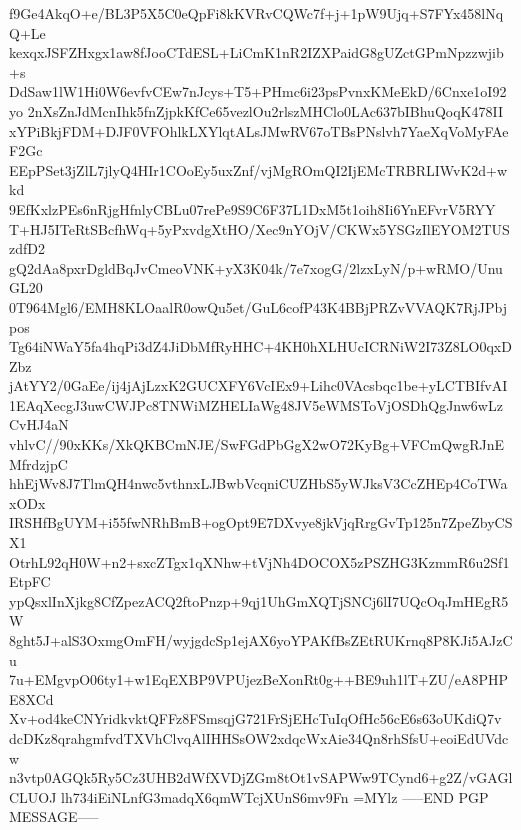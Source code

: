 f9Ge4AkqO+e/BL3P5X5C0eQpFi8kKVRvCQWc7f+j+1pW9Ujq+S7FYx458lNqQ+Le
kexqxJSFZHxgx1aw8fJooCTdESL+LiCmK1nR2IZXPaidG8gUZctGPmNpzzwjib+s
DdSaw1lW1Hi0W6evfvCEw7nJcys+T5+PHmc6i23psPvnxKMeEkD/6Cnxe1oI92yo
2nXsZnJdMcnIhk5fnZjpkKfCe65vezlOu2rlszMHClo0LAc637bIBhuQoqK478II
xYPiBkjFDM+DJF0VFOhlkLXYlqtALsJMwRV67oTBsPNslvh7YaeXqVoMyFAeF2Gc
EEpPSet3jZlL7jlyQ4HIr1COoEy5uxZnf/vjMgROmQI2IjEMcTRBRLIWvK2d+wkd
9EfKxlzPEs6nRjgHfnlyCBLu07rePe9S9C6F37L1DxM5t1oih8Ii6YnEFvrV5RYY
T+HJ5ITeRtSBcfhWq+5yPxvdgXtHO/Xec9nYOjV/CKWx5YSGzIlEYOM2TUSzdfD2
gQ2dAa8pxrDgldBqJvCmeoVNK+yX3K04k/7e7xogG/2lzxLyN/p+wRMO/UnuGL20
0T964Mgl6/EMH8KLOaalR0owQu5et/GuL6cofP43K4BBjPRZvVVAQK7RjJPbjpos
Tg64iNWaY5fa4hqPi3dZ4JiDbMfRyHHC+4KH0hXLHUcICRNiW2I73Z8LO0qxDZbz
jAtYY2/0GaEe/ij4jAjLzxK2GUCXFY6VcIEx9+Lihc0VAcsbqc1be+yLCTBIfvAI
1EAqXecgJ3uwCWJPc8TNWiMZHELIaWg48JV5eWMSToVjOSDhQgJnw6wLzCvHJ4aN
vhlvC//90xKKs/XkQKBCmNJE/SwFGdPbGgX2wO72KyBg+VFCmQwgRJnEMfrdzjpC
hhEjWv8J7TlmQH4nwc5vthnxLJBwbVcqniCUZHbS5yWJksV3CcZHEp4CoTWaxODx
IRSHfBgUYM+i55fwNRhBmB+ogOpt9E7DXvye8jkVjqRrgGvTp125n7ZpeZbyCSX1
OtrhL92qH0W+n2+sxcZTgx1qXNhw+tVjNh4DOCOX5zPSZHG3KzmmR6u2Sf1EtpFC
ypQsxlInXjkg8CfZpezACQ2ftoPnzp+9qj1UhGmXQTjSNCj6lI7UQcOqJmHEgR5W
8ght5J+alS3OxmgOmFH/wyjgdcSp1ejAX6yoYPAKfBsZEtRUKrnq8P8KJi5AJzCu
7u+EMgvpO06ty1+w1EqEXBP9VPUjezBeXonRt0g++BE9uh1lT+ZU/eA8PHPE8XCd
Xv+od4keCNYridkvktQFFz8FSmsqjG721FrSjEHcTuIqOfHc56cE6s63oUKdiQ7v
dcDKz8qrahgmfvdTXVhClvqAlIHHSsOW2xdqcWxAie34Qn8rhSfsU+eoiEdUVdcw
n3vtp0AGQk5Ry5Cz3UHB2dWfXVDjZGm8tOt1vSAPWw9TCynd6+g2Z/vGAGlCLUOJ
lh734iEiNLnfG3madqX6qmWTcjXUnS6mv9Fn
=MYlz
-----END PGP MESSAGE-----
